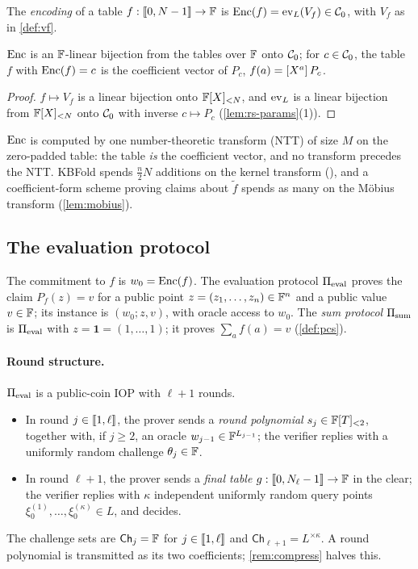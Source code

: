 \begin{definition}[Encoding]\label{def:encoding}
The \emph{encoding} of a table $f : \llbracket 0, N-1 \rrbracket \to \mathbb{F}$ is $\mathrm{Enc}(f) = \mathrm{ev}_L(V_f) \in \mathcal{C}_0$, with $V_f$ as in \cref{def:vf}.
\end{definition}

\begin{lemma}[Encoding]\label{lem:encoding}
$\mathrm{Enc}$ is an $\mathbb{F}$-linear bijection from the tables over $\mathbb{F}$ onto $\mathcal{C}_0$; for $c \in \mathcal{C}_0$, the table $f$ with $\mathrm{Enc}(f) = c$ is the coefficient vector of $P_c$, $f(a) = [X^{a}]\,P_c$.
\end{lemma}

\begin{proof}
$f \mapsto V_f$ is a linear bijection onto $\mathbb{F}[X]_{<N}$, and $\mathrm{ev}_L$ is a linear bijection from $\mathbb{F}[X]_{<N}$ onto $\mathcal{C}_0$ with inverse $c \mapsto P_c$ (\cref{lem:rs-params}(1)).
\end{proof}

$\mathrm{Enc}$ is computed by one number-theoretic transform (NTT) of size $M$ on the zero-padded table: the table \emph{is} the coefficient vector, and no transform precedes the NTT.
KBFold spends $\tfrac{n}{2}N$ additions on the kernel transform (), and a coefficient-form scheme proving claims about $\tilde f$ spends as many on the M\"obius transform (\cref{lem:mobius}).

\subsection{The evaluation protocol}\label{sec:scheme:protocol}

The commitment to $f$ is $w_0 = \mathrm{Enc}(f)$.
The evaluation protocol $\Pi_{\mathrm{eval}}$ proves the claim $P_f(z) = v$ for a public point $z = (z_1,\dots,z_n) \in \mathbb{F}^n$ and a public value $v \in \mathbb{F}$; its instance is $(w_0; z, v)$, with oracle access to $w_0$.
The \emph{sum protocol} $\Pi_{\mathrm{sum}}$ is $\Pi_{\mathrm{eval}}$ with $z = \mathbf 1 = (1,\dots,1)$; it proves $\sum_a f(a) = v$ (\cref{def:pcs}).

\paragraph{Round structure.}
$\Pi_{\mathrm{eval}}$ is a public-coin IOP with $\ell + 1$ rounds.
\begin{itemize}
  \item In round $j \in \llbracket 1, \ell \rrbracket$, the prover sends a \emph{round polynomial} $s_j \in \mathbb{F}[T]_{<2}$, together with, if $j \ge 2$, an oracle $w_{j-1} \in \mathbb{F}^{L_{j-1}}$; the verifier replies with a uniformly random challenge $\theta_j \in \mathbb{F}$.
  \item In round $\ell + 1$, the prover sends a \emph{final table} $g : \llbracket 0, N_\ell - 1 \rrbracket \to \mathbb{F}$ in the clear; the verifier replies with $\kappa$ independent uniformly random query points $\xi^{(1)}_0,\dots,\xi^{(\kappa)}_0 \in L$, and decides.
\end{itemize}
The challenge sets are $\mathsf{Ch}_j = \mathbb{F}$ for $j \in \llbracket 1, \ell \rrbracket$ and $\mathsf{Ch}_{\ell+1} = L^{\times\kappa}$.
A round polynomial is transmitted as its two coefficients; \cref{rem:compress} halves this.

